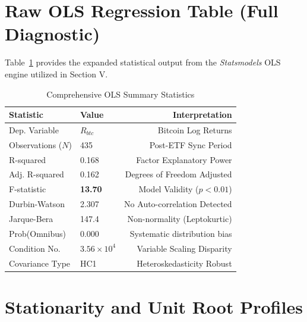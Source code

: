 \documentclass[10pt, conference, compsocconf]{IEEEtran}
\begin{document}

\section{Raw OLS Regression Table (Full Diagnostic)}

Table~\ref{tab:full_ols} provides the expanded statistical output from the \textit{Statsmodels} OLS engine utilized in Section V.

\begin{table}[htbp]
\caption{Comprehensive OLS Summary Statistics}
\centering
\small
\renewcommand{\arraystretch}{1.3}
\begin{tabularx}{\linewidth}{lXr}
\toprule
\textbf{Statistic} & \textbf{Value} & \textbf{Interpretation} \\
\midrule
Dep. Variable & $R_{btc}$ & Bitcoin Log Returns \\
Observations ($N$) & 435 & Post-ETF Sync Period \\
R-squared & 0.168 & Factor Explanatory Power \\
Adj. R-squared & 0.162 & Degrees of Freedom Adjusted \\
F-statistic & \textbf{13.70} & Model Validity ($p < 0.01$) \\
Durbin-Watson & 2.307 & No Auto-correlation Detected \\
Jarque-Bera & 147.4 & Non-normality (Leptokurtic) \\
Prob(Omnibus) & 0.000 & Systematic distribution bias \\
Condition No. & $3.56 \times 10^4$ & Variable Scaling Disparity \\
Covariance Type & HC1 & Heteroskedasticity Robust \\
\bottomrule
\end{tabularx}
\label{tab:full_ols}
\end{table}


\section{Stationarity and Unit Root Profiles}
\end{document}
